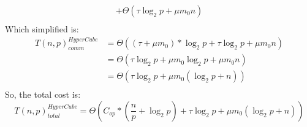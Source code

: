 \documentclass{article}
\begin{document}
\begin{enumerate}[i.]
\begin{multline*}
                + \Theta(\tau \log_{2}{p} + \mu m_{0}{n}) \\
            \end{multline*}
            Which simplified is:
            \begin{align*}
                {T(n,p)}_{comm}^{HyperCube} &= \Theta((\tau + \mu m_{0})*\log_{2}p + \tau \log_{2}{p} + \mu m_{0}{n}) \\
                &= \Theta(\tau \log_{2}p + \mu m_{0}\log_{2}p + \mu m_{0}{n}) \\
                &= \Theta(\tau \log_{2}p + \mu m_{0}(\log_{2}p + {n})) \\
            \end{align*}
            So, the total cost is:
            \begin{equation}
                {T(n,p)}_{total}^{HyperCube} = \Theta(C_{op} * (\frac{n}{p} + \log_{2} p) + \tau \log_{2}p + \mu m_{0}(\log_{2}p + {n}))
            \end{equation}

    \end{enumerate}
\end{document}
